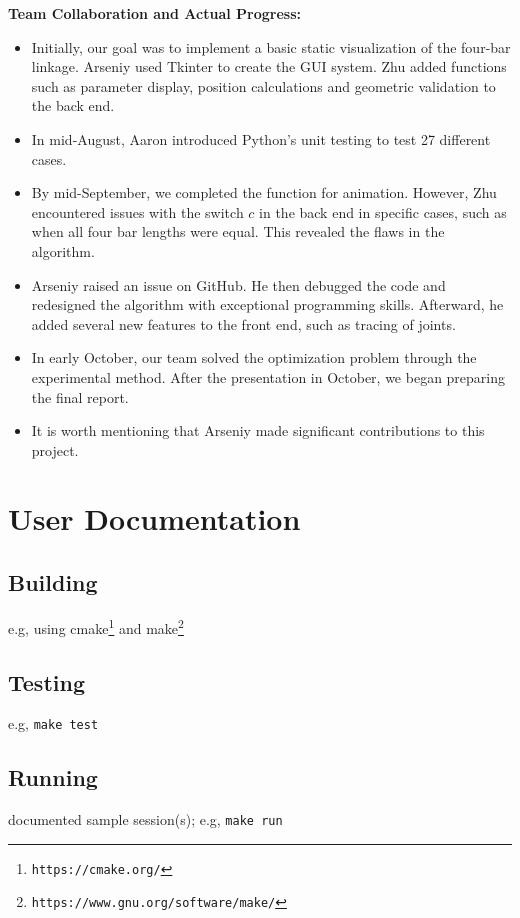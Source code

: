 \documentclass{article}
\begin{document}
\textbf{Team Collaboration and Actual Progress:}
\begin{itemize}
    \item Initially, our goal was to implement a basic static visualization of the four-bar linkage. Arseniy used Tkinter to create the GUI system. Zhu added functions such as parameter display, position calculations and geometric validation to the back end.
    \item In mid-August, Aaron introduced Python's unit testing to test 27 different cases.
    \item By mid-September, we completed the function for animation. However, Zhu encountered issues with the switch \(c\) in the back end in specific cases, such as when all four bar lengths were equal. This revealed the flaws in the algorithm.
    \item Arseniy raised an issue on GitHub. He then debugged the code and redesigned the algorithm with exceptional programming skills. Afterward, he added several new features to the front end, such as tracing of joints.
    \item In early October, our team solved the optimization problem through the experimental method. After the presentation in October, we began preparing the final report.  
    \item It is worth mentioning that Arseniy made significant contributions to this project.
\end{itemize}






\appendix

\section{User Documentation} \label{ch:userdoc}

\subsection{Building}

e.g, using cmake\footnote{\tt https://cmake.org/} and make\footnote{\tt https://www.gnu.org/software/make/}


\subsection{Testing}

e.g, \verb!make test!

\subsection{Running}

documented sample session(s); e.g, \verb!make run!
\end{document}
